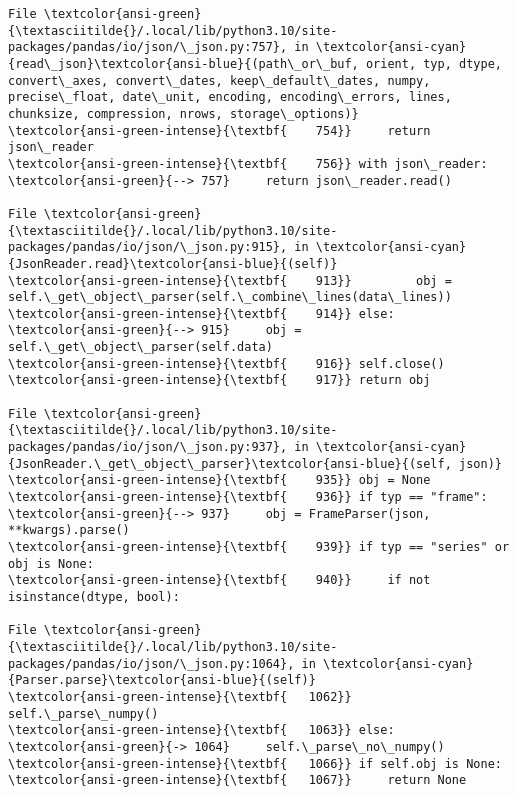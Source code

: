 \documentclass[11pt]{article}
\begin{document}
\begin{Verbatim}[commandchars=\\\{\}, frame=single, framerule=2mm, rulecolor=\color{outerrorbackground}]
File \textcolor{ansi-green}{\textasciitilde{}/.local/lib/python3.10/site-packages/pandas/io/json/\_json.py:757}, in \textcolor{ansi-cyan}{read\_json}\textcolor{ansi-blue}{(path\_or\_buf, orient, typ, dtype, convert\_axes, convert\_dates, keep\_default\_dates, numpy, precise\_float, date\_unit, encoding, encoding\_errors, lines, chunksize, compression, nrows, storage\_options)}
\textcolor{ansi-green-intense}{\textbf{    754}}     return json\_reader
\textcolor{ansi-green-intense}{\textbf{    756}} with json\_reader:
\textcolor{ansi-green}{--> 757}     return json\_reader.read()

File \textcolor{ansi-green}{\textasciitilde{}/.local/lib/python3.10/site-packages/pandas/io/json/\_json.py:915}, in \textcolor{ansi-cyan}{JsonReader.read}\textcolor{ansi-blue}{(self)}
\textcolor{ansi-green-intense}{\textbf{    913}}         obj = self.\_get\_object\_parser(self.\_combine\_lines(data\_lines))
\textcolor{ansi-green-intense}{\textbf{    914}} else:
\textcolor{ansi-green}{--> 915}     obj = self.\_get\_object\_parser(self.data)
\textcolor{ansi-green-intense}{\textbf{    916}} self.close()
\textcolor{ansi-green-intense}{\textbf{    917}} return obj

File \textcolor{ansi-green}{\textasciitilde{}/.local/lib/python3.10/site-packages/pandas/io/json/\_json.py:937}, in \textcolor{ansi-cyan}{JsonReader.\_get\_object\_parser}\textcolor{ansi-blue}{(self, json)}
\textcolor{ansi-green-intense}{\textbf{    935}} obj = None
\textcolor{ansi-green-intense}{\textbf{    936}} if typ == "frame":
\textcolor{ansi-green}{--> 937}     obj = FrameParser(json, **kwargs).parse()
\textcolor{ansi-green-intense}{\textbf{    939}} if typ == "series" or obj is None:
\textcolor{ansi-green-intense}{\textbf{    940}}     if not isinstance(dtype, bool):

File \textcolor{ansi-green}{\textasciitilde{}/.local/lib/python3.10/site-packages/pandas/io/json/\_json.py:1064}, in \textcolor{ansi-cyan}{Parser.parse}\textcolor{ansi-blue}{(self)}
\textcolor{ansi-green-intense}{\textbf{   1062}}     self.\_parse\_numpy()
\textcolor{ansi-green-intense}{\textbf{   1063}} else:
\textcolor{ansi-green}{-> 1064}     self.\_parse\_no\_numpy()
\textcolor{ansi-green-intense}{\textbf{   1066}} if self.obj is None:
\textcolor{ansi-green-intense}{\textbf{   1067}}     return None


\end{Verbatim}
\end{document}
